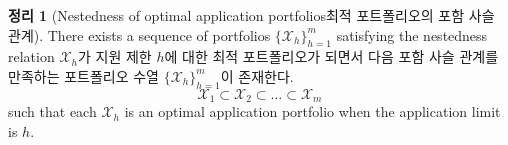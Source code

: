 \documentclass[11pt]{article} %
\newtheorem{theorem}{Theorem}
\newtheorem{lemma}{Lemma}
\theoremstyle{definition}
\newtheorem{theorem}{정리}
\newtheorem{lemma}{기본 정리}
\theoremstyle{definition}
\begin{document}
%

\begin{theorem}[\ifen Nestedness of optimal application portfolios\else 최적 포트폴리오의 포함 사슬 관계\fi] \label{nestedapplication}
\ifen There exists a sequence of portfolios $\{\mathcal{X}_h\}_{h=1}^m$ satisfying the nestedness relation
\else  $\mathcal{X}_h$가 지원 제한 $h$에 대한 최적 포트폴리오가 되면서 다음 포함 사슬 관계를 만족하는 포트폴리오 수열 $\{\mathcal{X}_h\}_{h=1}^m$이 존재한다.\fi
\begin{equation}
\mathcal{X}_1 \subset \mathcal{X}_2\subset \dots \subset \mathcal{X}_m
\end{equation}
\ifen such that each $\mathcal{X}_h$ is an optimal application portfolio when the application limit is $h$.\fi
\end{theorem}
\end{document}
